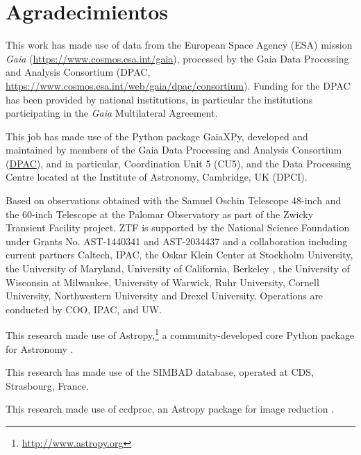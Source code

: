 \documentclass{sty/uanl}
\newcommand{\citeyearparen}[1]{\textcite{#1}}
\begin{document}






\appendix


\chapter*{Agradecimientos}
This work has made use of data from the European Space Agency (ESA) mission
\textit{Gaia} (\url{https://www.cosmos.esa.int/gaia}), processed by the Gaia
Data Processing and Analysis Consortium (DPAC,
\url{https://www.cosmos.esa.int/web/gaia/dpac/consortium}). Funding for the DPAC
has been provided by national institutions, in particular the institutions
participating in the {\it Gaia} Multilateral Agreement.

This job has made use of the Python package GaiaXPy, developed and maintained by
members of the Gaia Data Processing and Analysis Consortium
(\href{https://www.cosmos.esa.int/web/gaia/dpac/consortium}{DPAC}), and in
particular, Coordination Unit 5 (CU5), and the Data Processing Centre located at
the Institute of Astronomy, Cambridge, UK (DPCI).

Based on observations obtained with the Samuel Oschin Telescope 48-inch and the 60-inch Telescope at the Palomar
Observatory as part of the Zwicky Transient Facility project. ZTF is supported by the National Science Foundation under Grants
No. AST-1440341 and AST-2034437 and a collaboration including current partners Caltech, IPAC, the Oskar Klein Center at
Stockholm University, the University of Maryland, University of California, Berkeley , the University of Wisconsin at Milwaukee,
University of Warwick, Ruhr University, Cornell University, Northwestern University and Drexel University. Operations are
conducted by COO, IPAC, and UW.

This research made use of Astropy,\footnote{\url{http://www.astropy.org}} a
community-developed core Python package for Astronomy \citeyearparen{astropy}.

This research has made use of the SIMBAD database, operated at CDS, Strasbourg, France.

This research made use of ccdproc, an Astropy package for
image reduction \citeyearparen{ccdproc241}.
\clearpage

\printbibliography
\end{document}

